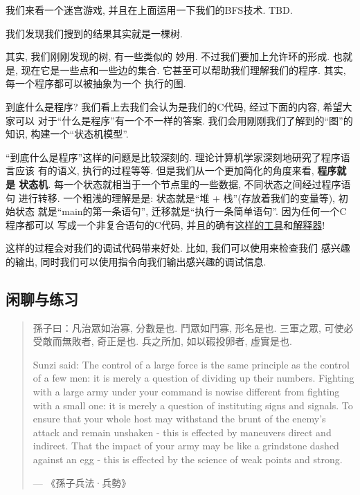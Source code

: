 我们来看一个迷宫游戏, 并且在上面运用一下我们的BFS技术. TBD. 

我们发现我们搜到的结果其实就是一棵树. 

 其实, 我们刚刚发现的树, 有一些类似的
妙用. 不过我们要加上允许环的形成. 也就是, 现在它是一些点和一些边的集合.
它甚至可以帮助我们理解我们的程序. 其实, 每一个程序都可以被抽象为一个
执行的图. 

到底什么是程序? 我们看上去我们会认为是我们的C代码, 经过下面的内容, 希望大家可以
对于``什么是程序''有一个不一样的答案. 我们会用刚刚我们了解到的``图''的知识, 
构建一个``状态机模型''. \cite{jyyos-prog}

``到底什么是程序''这样的问题是比较深刻的. 理论计算机学家深刻地研究了程序语言应该
有的语义, 执行的过程等等. 但是我们从一个更加简化的角度来看, \textbf{程序就是
状态机}. 每一个状态就相当于一个节点里的一些数据, 不同状态之间经过程序语句
进行转移. 一个粗浅的理解是是: 状态就是``堆 + 栈''(存放着我们的变量等), 初始状态
就是``main的第一条语句'', 迁移就是``执行一条简单语句''. 因为任何一个C程序都可以
写成一个非复合语句的C代码, 并且的确有\href{https://cil-project.github.io/cil/}{这样的工具}和\href{https://gitlab.com/zsaleeba/picoc}{解释器}! 

这样的过程会对我们的调试代码带来好处. 比如, 我们可以使用来检查我们
感兴趣的输出, 同时我们可以使用指令向我们输出感兴趣的调试信息. 

\subsection*{闲聊与练习} 

\begin{quote}
    孫子曰：凡治眾如治寡, 分數是也. 鬥眾如鬥寡, 形名是也. 三軍之眾, 可使必受敵而無敗者, 奇正是也. 兵之所加, 如以碬投卵者, 虛實是也. 

    Sunzi said: The control of a large force is the same principle as
    the control of a few men: it is merely a question of dividing up
    their numbers. Fighting with a large army under your command is 
    nowise different from fighting with a small one: it is merely a 
    question of instituting signs and signals. To ensure that your 
    whole host may withstand the brunt of the enemy's attack and 
    remain unshaken - this is effected by maneuvers direct and 
    indirect. That the impact of your army may be like a grindstone 
    dashed against an egg - this is effected by the science of weak 
    points and strong.
    
    \hfill ---  《孫子兵法·兵勢》
\end{quote}

